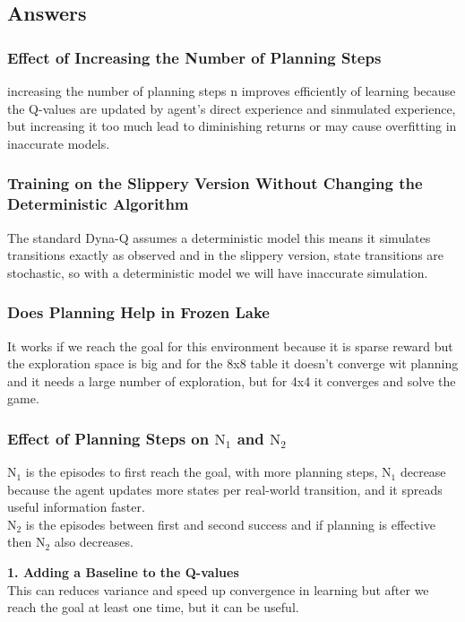 \subsection{Answers}
\subsubsection{Effect of Increasing the Number of Planning Steps}
increasing the number of planning steps n improves efficiently of learning because the Q-values are updated by agent's direct experience and sinmulated experience, but increasing it too much lead to diminishing returns or may cause overfitting in inaccurate models.

\subsubsection{Training on the Slippery Version Without Changing the Deterministic Algorithm}
The standard Dyna-Q assumes a deterministic model this means it simulates transitions exactly as observed and in the slippery version, state transitions are stochastic, so with a deterministic model we will have inaccurate simulation.

\subsubsection{Does Planning Help in Frozen Lake}
It works if we reach the goal for this environment because it is sparse reward but the exploration space is big and for the 8x8 table it doesn't converge wit planning and it needs a large number of exploration, but for 4x4 it converges and solve the game.

\subsubsection{Effect of Planning Steps on $\text{N}_1$ and $\text{N}_2$}
$\text{N}_1$ is the episodes to first reach the goal, with more planning steps, $\text{N}_1$ decrease because the agent updates more states per real-world transition, and it spreads useful information faster.\\
$\text{N}_2$ is the episodes between first and second success and if planning is effective then $\text{N}_2$ also decreases.

\textbf{1. Adding a Baseline to the Q-values}\\
This can reduces variance and speed up convergence in learning but after we reach the goal at least one time, but it can be useful.

